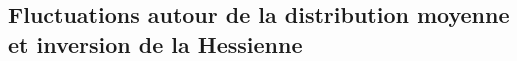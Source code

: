 %
%
%
%
%
%
% 
 
 \subsection{Fluctuations autour de la distribution moyenne et inversion de la Hessienne}
 
